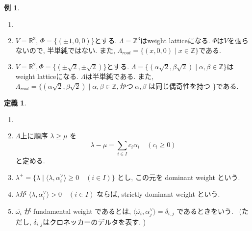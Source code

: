 \documentclass[
  a4paper, 
  12pt,
  ja=standard,
  xelatex,
  left=30truemm,
  right=30truemm,
  titlepage 
]{bxjsarticle}
\theoremstyle{definition}
\newtheorem{df}{定義}
\newtheorem*{ex}{例}
\begin{document}
\begin{ex}
  \begin{enumerate}
    \item[]
    \item $V = \mathbb{R}^3$, $\Phi = \{ (\pm1, 0, 0) \}$とする. $\Lambda = \mathbb{Z}^3$はweight latticeになる.
          $\Phi$は$V$を張らないので, 半単純ではない. また, $\Lambda_{ root } = \{ (x, 0 , 0) \mid x \in \mathbb{Z} \}$である.
    \item $V = \mathbb{R}^2, \Phi = \{ (\pm \sqrt{2}, \pm \sqrt{2}) \}$とする. $\Lambda = \{  (\alpha \sqrt{2}, \beta \sqrt{2}) \mid \alpha, \beta \in \mathbb{Z} \}$はweight latticeになる.
          $\Lambda$は半単純である. また, $\Lambda_{ root } = \{  (\alpha \sqrt{2}, \beta \sqrt{2}) \mid \alpha, \beta \in \mathbb{Z}, \text{かつ} \ \alpha, \beta \text{ は同じ偶奇性を持つ }\}$である.
  \end{enumerate}
\end{ex}

\begin{df}
  \begin{enumerate}
    \item []
    \item $\Lambda$上に順序 $\lambda \geq \mu$ を
      $$ \lambda - \mu = \sum_{i \in I} c_i \alpha_i \quad ( c_i \geq 0 ) $$
      と定める.
    \item $\lambda^{+} = \{ \lambda \mid \langle \lambda, \alpha_i^{\vee} \rangle \geq 0 \quad (i \in I) \}$ とし, この元を dominant weight という.
    \item $\lambda$が $\langle \lambda, \alpha_i^{\vee} \rangle > 0 \quad (i \in I)$ ならば, strictly dominant weight という.
    \item $\bar{\omega_i}$ が fundamental weight であるとは, $\langle \bar{\omega_i}, \alpha_j^{\vee} \rangle = \delta_{i, j}$
    であるときをいう. \ (ただし, $\delta_{i, j}$はクロネッカーのデルタを表す. )
  \end{enumerate}
\end{df}
\end{document}
